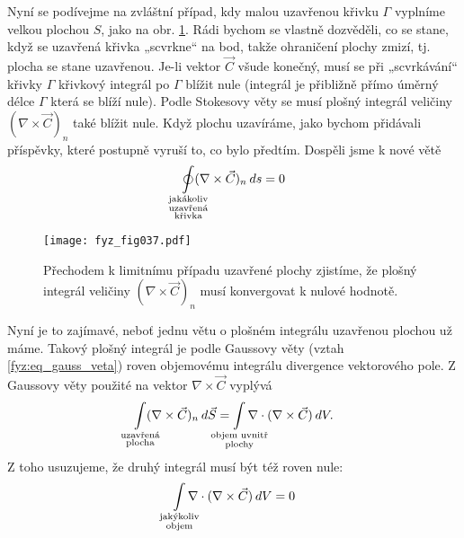 {       
    Nyní se podívejme na zvláštní případ, kdy malou uzavřenou křivku \(\Gamma\) vyplníme velkou 
    plochou \(S\), jako na obr. \ref{fyz:fig037}. Rádi bychom se vlastně dozvěděli, co se 
    stane, když se uzavřená křivka „scvrkne“ na bod, takže ohraničení plochy zmizí, tj. plocha se 
    stane uzavřenou. Je-li vektor \(\vec{C}\) všude konečný, musí se při „scvrkávání“ křivky 
    \(\Gamma\) křivkový integrál po \(\Gamma\) blížit nule (integrál je přibližně přímo úměrný 
    délce \(\Gamma\) která se blíží nule). Podle Stokesovy věty se musí plošný integrál veličiny 
    \((\nabla\times\vec{C})_n\) také blížit nule. Když plochu uzavíráme, jako bychom přidávali 
    příspěvky, které postupně vyruší to, co bylo předtím. Dospěli jsme k nové větě
    \begin{equation}\label{fyz:eq_fey_null1} 
      \limitoint_{\mathclap{\substack{\text{jakákoliv}\\\text{uzavřená}\\\text{křivka}}}}
       (\nabla\times\vec{C})_n \dd{s} = 0
    \end{equation}

    \begin{figure}[ht!]  %
      \centering
      \texttt{[image: fyz\_fig037.pdf]}
      \caption{Přechodem k limitnímu případu uzavřené plochy zjistíme, že plošný integrál veličiny
               \((\nabla\times\vec{C})_n\) musí konvergovat k nulové hodnotě.
               \cite[s.~60]{Feynman02}}
      \label{fyz:fig037}
    \end{figure}
    Nyní je to zajímavé, neboť jednu větu o plošném integrálu uzavřenou plochou už máme. Takový 
    plošný integrál je podle Gaussovy věty (vztah \ref{fyz:eq_gauss_veta}) roven objemovému 
    integrálu divergence vektorového pole. Z Gaussovy věty použité na vektor 
    \(\nabla\times\vec{C}\) vyplývá
    \begin{equation}\label{fyz:eq_fey_null2} 
      \limitint_{\mathclap{\substack{\text{uzavřená}\\\text{plocha}}}}
       (\nabla\times\vec{C})_n \dd{\vec{S}}
      =
      \limitint_{\mathclap{\substack{\text{objem uvnitř}\\\text{plochy}}}}
        \nabla\cdot(\nabla\times\vec{C})\dd{V}.
    \end{equation}
    Z toho usuzujeme, že druhý integrál musí být též roven nule:
    \begin{equation}\label{fyz:eq_fey_null3} 
     \limitint_{\mathclap{\substack{\text{jakýkoliv}\\\text{objem}}}}
      \nabla\cdot(\nabla\times\vec{C})\dd{V} = 0
    \end{equation}
            
}
